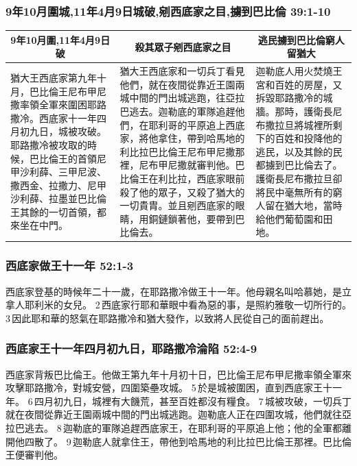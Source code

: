 \subsubsection{9年10月圍城,11年4月9日城破,剜西底家之目,擄到巴比倫 39:1-10}
\begin{table}[H]
\centering
\begin{tabular}{p{5.25cm}|p{7.0cm}|p{5.0cm}}\hline\hline
\multicolumn{1}{c|}{9年10月圍,11年4月9日破}&\multicolumn{1}{c|}{殺其眾子剜西底家之目}&\multicolumn{1}{c}{逃民擄到巴比倫窮人留猶大}\\\hline
猶大王西底家第九年十月，巴比倫王尼布甲尼撒率領全軍來圍困耶路撒冷。西底家十一年四月初九日，城被攻破。耶路撒冷被攻取的時候，巴比倫王的首領尼甲沙利薛、三甲尼波、撒西金、拉撒力、尼甲沙利薛、拉墨並巴比倫王其餘的一切首領，都來坐在中門。
&猶大王西底家和一切兵丁看見他們，就在夜間從靠近王園兩城中間的門出城逃跑，往亞拉巴逃去。迦勒底的軍隊追趕他們，在耶利哥的平原追上西底家，將他拿住，帶到哈馬地的利比拉巴比倫王尼布甲尼撒那裡，尼布甲尼撒就審判他。巴比倫王在利比拉，西底家眼前殺了他的眾子，又殺了猶大的一切貴胄。並且剜西底家的眼睛，用銅鏈鎖著他，要帶到巴比倫去。
&迦勒底人用火焚燒王宮和百姓的房屋，又拆毀耶路撒冷的城牆。那時，護衛長尼布撒拉旦將城裡所剩下的百姓和投降他的逃民，以及其餘的民都擄到巴比倫去了。護衛長尼布撒拉旦卻將民中毫無所有的窮人留在猶大地，當時給他們葡萄園和田地。\\\hline
\end{tabular}
\end{table}

\subsubsection{西底家做王十一年 52:1-3}
西底家登基的時候年二十一歲，在耶路撒冷做王十一年。他母親名叫哈慕她，是立拿人耶利米的女兒。 2 西底家行耶和華眼中看為惡的事，是照約雅敬一切所行的。 3 因此耶和華的怒氣在耶路撒冷和猶大發作，以致將人民從自己的面前趕出。

\subsubsection{西底家王十一年四月初九日，耶路撒冷淪陷 52:4-9}
西底家背叛巴比倫王。他做王第九年十月初十日，巴比倫王尼布甲尼撒率領全軍來攻擊耶路撒冷，對城安營，四圍築壘攻城。 5 於是城被圍困，直到西底家王十一年。 6 四月初九日，城裡有大饑荒，甚至百姓都沒有糧食。 7 城被攻破，一切兵丁就在夜間從靠近王園兩城中間的門出城逃跑。迦勒底人正在四圍攻城，他們就往亞拉巴逃去。 8 迦勒底的軍隊追趕西底家王，在耶利哥的平原追上他；他的全軍都離開他四散了。 9 迦勒底人就拿住王，帶他到哈馬地的利比拉巴比倫王那裡。巴比倫王便審判他。

